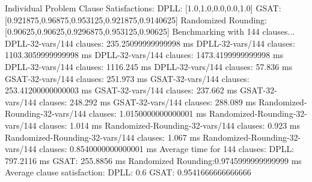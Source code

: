 \documentclass{article}
\begin{document}
\newline
Individual Problem Clause Satisfactions:\newline
  DPLL:               [1.0,1.0,0.0,0.0,1.0]\newline
  GSAT:               [0.921875,0.96875,0.953125,0.921875,0.9140625]\newline
  Randomized Rounding:[0.90625,0.90625,0.9296875,0.953125,0.90625]\newline
\newline
\newline
Benchmarking with 144 clauses...\newline
DPLL-32-vars/144 clauses: 235.25099999999998 ms\newline
DPLL-32-vars/144 clauses: 1103.3059999999998 ms\newline
DPLL-32-vars/144 clauses: 1473.4199999999998 ms\newline
DPLL-32-vars/144 clauses: 1116.245 ms\newline
DPLL-32-vars/144 clauses: 57.836 ms\newline
GSAT-32-vars/144 clauses: 251.973 ms\newline
GSAT-32-vars/144 clauses: 253.41200000000003 ms\newline
GSAT-32-vars/144 clauses: 237.662 ms\newline
GSAT-32-vars/144 clauses: 248.292 ms\newline
GSAT-32-vars/144 clauses: 288.089 ms\newline
Randomized-Rounding-32-vars/144 clauses: 1.0150000000000001 ms\newline
Randomized-Rounding-32-vars/144 clauses: 1.014 ms\newline
Randomized-Rounding-32-vars/144 clauses: 0.923 ms\newline
Randomized-Rounding-32-vars/144 clauses: 1.067 ms\newline
Randomized-Rounding-32-vars/144 clauses: 0.8540000000000001 ms\newline
Average time for 144 clauses:\newline
  DPLL:               797.2116 ms\newline
  GSAT:               255.8856 ms\newline
  Randomized Rounding:0.9745999999999999 ms\newline
Average clause satisfaction:\newline
  DPLL:               0.6\newline
  GSAT:               0.9541666666666666\newline
\end{document}
